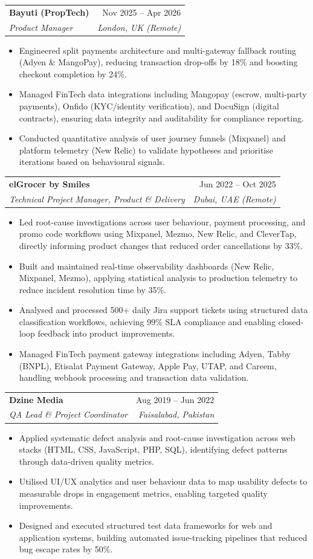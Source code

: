 \documentclass[letterpaper,10pt]{article}
\makeatletter
\newcommand{\resumeItem}[1]{
  \item\small{
    {#1 \vspace{-2pt}}
  }
}
\newcommand{\resumeSubheading}[4]{
  \vspace{-2pt}\item
    \begin{tabular*}{0.97\textwidth}[t]{l@{\extracolsep{\fill}}r}
      \textbf{#1} & #2 \\
      \textit{\small#3} & \textit{\small #4} \\
    \end{tabular*}\vspace{-7pt}
}
\newcommand{\resumeItemListStart}{\begin{itemize}[leftmargin=0.15in]}
\newcommand{\resumeItemListEnd}{\end{itemize}\vspace{-5pt}}
\makeatother
\begin{document}
    \resumeSubheading
      {Bayuti (PropTech)}{Nov 2025 – Apr 2026}
      {Product Manager}{London, UK (Remote)}
      \resumeItemListStart
        \resumeItem{Engineered split payments architecture and multi-gateway fallback routing (Adyen \& MangoPay), reducing transaction drop-offs by 18\% and boosting checkout completion by 24\%.}
        \resumeItem{Managed FinTech data integrations including Mangopay (escrow, multi-party payments), Onfido (KYC/identity verification), and DocuSign (digital contracts), ensuring data integrity and auditability for compliance reporting.}
        \resumeItem{Conducted quantitative analysis of user journey funnels (Mixpanel) and platform telemetry (New Relic) to validate hypotheses and prioritise iterations based on behavioural signals.}
      \resumeItemListEnd

    \resumeSubheading
      {elGrocer by Smiles}{Jun 2022 – Oct 2025}
      {Technical Project Manager, Product \& Delivery}{Dubai, UAE (Remote)}
      \resumeItemListStart
        \resumeItem{Led root-cause investigations across user behaviour, payment processing, and promo code workflows using Mixpanel, Mezmo, New Relic, and CleverTap, directly informing product changes that reduced order cancellations by 33\%.}
        \resumeItem{Built and maintained real-time observability dashboards (New Relic, Mixpanel, Mezmo), applying statistical analysis to production telemetry to reduce incident resolution time by 35\%.}
        \resumeItem{Analysed and processed 500+ daily Jira support tickets using structured data classification workflows, achieving 99\% SLA compliance and enabling closed-loop feedback into product improvements.}
        \resumeItem{Managed FinTech payment gateway integrations including Adyen, Tabby (BNPL), Etisalat Payment Gateway, Apple Pay, UTAP, and Careem, handling webhook processing and transaction data validation.}
      \resumeItemListEnd

    \resumeSubheading
      {Dzine Media}{Aug 2019 – Jun 2022}
      {QA Lead \& Project Coordinator}{Faisalabad, Pakistan}
      \resumeItemListStart
        \resumeItem{Applied systematic defect analysis and root-cause investigation across web stacks (HTML, CSS, JavaScript, PHP, SQL), identifying defect patterns through data-driven quality metrics.}
        \resumeItem{Utilised UI/UX analytics and user behaviour data to map usability defects to measurable drops in engagement metrics, enabling targeted quality improvements.}
        \resumeItem{Designed and executed structured test data frameworks for web and application systems, building automated issue-tracking pipelines that reduced bug escape rates by 50\%.}
      \resumeItemListEnd
\end{document}
